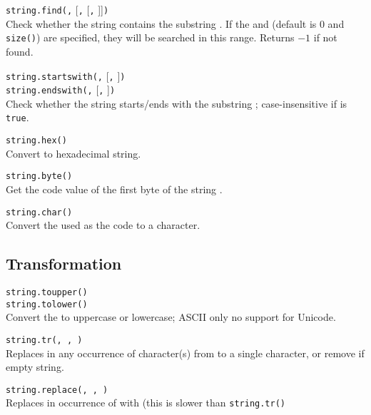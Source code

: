 \hangpar \texttt{string.find(}\texttt{,} [\texttt{,} [\texttt{,} ]]\texttt{)}\\
Check whether the string  contains the substring . If the  and  (default is $0$ and \texttt{size(}\texttt{)}) are specified, they will be searched in this range. Returns $-1$ if not found.

\hangpartwo \texttt{string.startswith(}\texttt{,} [\texttt{,} ]\texttt{)}\\
\texttt{string.endswith(}\texttt{,} [\texttt{,} ]\texttt{)}\\
Check whether the string  starts/ends with the substring ; case-insensitive if  is \texttt{true}.

\hangpar \texttt{string.hex(}\texttt{)}\\
Convert  to hexadecimal string.

\hangpar \texttt{string.byte(}\texttt{)}\\
Get the code value of the first byte of the string .

\hangpar \texttt{string.char(}\texttt{)}\\
Convert the  used as the code to a character.

\subsection*{Transformation}

\hangpartwo \texttt{string.toupper(}\texttt{)}\\
\texttt{string.tolower(}\texttt{)}\\
Convert the  to uppercase or lowercase; ASCII only no support for Unicode.

\hangpar \texttt{string.tr(}\texttt{, }\texttt{, }\texttt{)}\\
Replaces in  any occurrence of character(s) from  to a single character, or remove if empty string.

\hangpar \texttt{string.replace(}\texttt{, }\texttt{, }\texttt{)}\\
Replaces in  occurrence of  with  (this is slower than \texttt{string.tr()}

